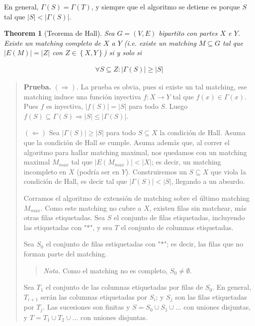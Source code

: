 \documentclass[a4paper]{article}
\newtheorem{theorem}{Theorem}
\newtheorem{theorem}{Theorem}
\begin{document}
En general, $\Gamma(S) = \Gamma(T)$, y siempre que el algoritmo se detiene es porque 
 $S$ tal que $|S| < |\Gamma(S)|$.

 \begin{theorem}[Teorema de Hall]
    Sea $G = (V, E)$ bipartito con partes $X$ e $Y$. Existe un matching
    completo de $X$ a $Y$ (i.e. existe un matching $M \subseteq G$ tal que
    $|E(M)| = |Z|$ con $Z \in \left\{ X, Y \right\} $) si y solo si

    \begin{align*}
        \forall S \subseteq Z : |\Gamma(S)| \geq |S|
    \end{align*}
\end{theorem}


\small
\begin{quote}

\textbf{Prueba.} $(\Rightarrow)$. La prueba es obvia, pues si existe un tal matching, 
ese matching induce una función inyectiva $f : X \to Y$ tal que 
$f(x) \in \Gamma(x)$. Pues $f$ es inyectiva, $|f(S)| = |S|$ para todo $S$. Luego 
$f(S) \subseteq \Gamma(S) \Rightarrow |S| \leq |\Gamma(S)|$.

$(\Leftarrow)$ Sea $|\Gamma(S)| \geq |S|$ para todo $S \subseteq X$ la
condición de Hall. Asuma que la condición de Hall se cumple. Asuma además que,
al correr el algoritmo para hallar matching maximal, nos quedamos con un
matching maximal $M_{max}$ tal que $|E(M_{max})| < |X|$; es decir, un matching
incompleto en $X$ (podría ser en $Y$). Construiremos un $S \subseteq X$ que
viola la condición de Hall, es decir tal que $|\Gamma(S)| < |S|$, llegando a un
absurdo.

Corramos el algoritmo de extensión de matching sobre el último matching
$M_{max}$. Como este matching no cubre a $X$, existen filas sin matchear,
más otras filas etiquetadas. Sea $S$ el conjunto de filas etiquetadas, incluyendo 
las etiquetadas con "$*$", y sea $T$ el conjunto de columnas etiquetadas.

Sea $S_0$ el conjunto de filas estiquetadas con "$*$"; es decir, las filas 
que no forman parte del matching. 


\small
\begin{quote}

\textit{Nota.} Como el matching no es completo, $S_0 \neq \emptyset$.

\end{quote}
\normalsize

Sea $T_1$ el conjunto de las columnas etiquetadas por filas de $S_0$. En
general, $T_{i+1}$ serán las columnas etiquetadas por $S_i$; y $S_j$ son las
filas etiquetadas por $T_j$. Las sucesiones son finitas y $S = S_0 \cup S_1
\cup  \ldots$ con uniones disjuntas, y $T = T_1 \cup T_2 \cup \ldots$ con
uniones disjuntas.


\end{quote}
\end{document}

